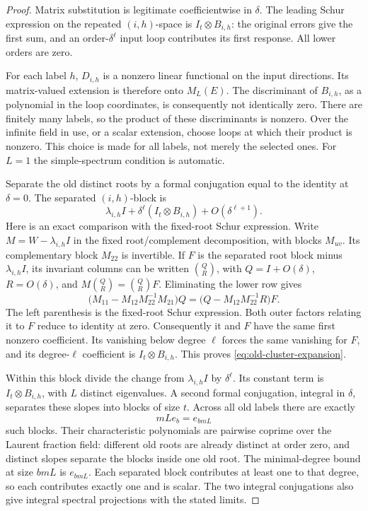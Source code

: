 \documentclass[11pt]{article}
\theoremstyle{definition}
\theoremstyle{remark}
\numberwithin{equation}{section}
\begin{document}
\begin{proof}
Matrix substitution is legitimate coefficientwise in \(\delta\).
The leading Schur expression on the repeated \((i,h)\)-space is
\(I_t\otimes B_{i,h}\): the original errors give the first sum,
and an order-\(\delta^\ell\) input loop contributes its first
response. All lower orders are zero.

For each label \(h\), \(D_{i,h}\) is a nonzero linear functional
on the input directions. Its matrix-valued extension is therefore
onto \(M_L(E)\). The discriminant of \(B_{i,h}\), as a polynomial
in the loop coordinates, is consequently not identically zero.
There are finitely many labels, so the product of these discriminants
is nonzero. Over the infinite field in use, or a scalar extension,
choose loops at which their product is nonzero. This choice is made
for all labels, not merely the selected ones. For \(L=1\) the
simple-spectrum condition is automatic.

Separate the old distinct roots by a formal conjugation equal to
the identity at \(\delta=0\). The separated \((i,h)\)-block is
\begin{equation}
 \lambda_{i,h}I+\delta^\ell(I_t\otimes B_{i,h})
 +O(\delta^{\ell+1}).
 \label{eq:old-cluster-expansion}
\end{equation}
Here is an exact comparison with the fixed-root Schur expression.
Write \(M=W-\lambda_{i,h}I\) in the fixed root/complement
decomposition, with blocks \(M_{uv}\). Its complementary block
\(M_{22}\) is invertible. If \(F\) is the separated root block
minus \(\lambda_{i,h}I\), its invariant columns can be written
\(\binom QR\), with \(Q=I+O(\delta)\), \(R=O(\delta)\), and
\(M\binom QR=\binom QR F\). Eliminating the lower row gives
\[
 \bigl(M_{11}-M_{12}M_{22}^{-1}M_{21}\bigr)Q
   =\bigl(Q-M_{12}M_{22}^{-1}R\bigr)F.
\]
The left parenthesis is the fixed-root Schur expression. Both
outer factors relating it to \(F\) reduce to identity at zero.
Consequently it and \(F\) have the same first nonzero coefficient.
Its vanishing below degree \(\ell\) forces the same vanishing
for \(F\), and its degree-\(\ell\) coefficient is
\(I_t\otimes B_{i,h}\). This proves
\eqref{eq:old-cluster-expansion}.

Within this block divide the change from \(\lambda_{i,h}I\) by
\(\delta^\ell\). Its constant term is \(I_t\otimes B_{i,h}\),
with \(L\) distinct eigenvalues. A second formal conjugation,
integral in \(\delta\), separates these slopes into blocks of
size \(t\). Across all old labels there are exactly
\[
 mLe_b=e_{bmL}
\]
such blocks. Their characteristic polynomials are pairwise coprime
over the Laurent fraction field: different old roots are already
distinct at order zero, and distinct slopes separate the blocks
inside one old root. The minimal-degree bound at size \(bmL\)
is \(e_{bmL}\). Each separated block contributes at least one
to that degree, so each contributes exactly one and is scalar.
The two integral conjugations also give integral spectral
projections with the stated limits.
\end{proof}
\end{document}
